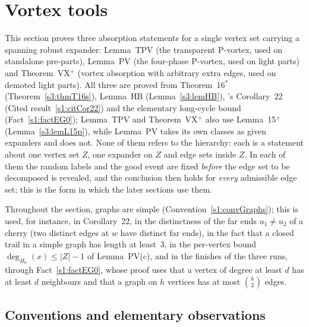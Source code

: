 \section{Vortex tools}\label{s4:sec}

This section proves three absorption statements for a single vertex set carrying a spanning robust expander:
Lemma~TPV (the transparent P-vortex, used on standalone pre-parts), Lemma~PV (the four-phase P-vortex, used on light
parts) and Theorem~VX$^+$ (vortex absorption with arbitrary extra edges, used on demoted light parts). All three are
proved from Theorem~16$^*$ (Theorem~\ref{s3:thmT16s}), Lemma~HB
(Lemma~\ref{s3:lemHB}), \BMnames's Corollary~22 (Cited result~\ref{s1:citCor22}) and the elementary long-cycle
bound (Fact~\ref{s1:factEG0}); Lemma~TPV and Theorem~VX$^+$ also use Lemma~15$^+$ (Lemma~\ref{s3:lemL15p}), while
Lemma~PV takes its own classes as given expanders and does not. None of them refers to the hierarchy: each is a statement about one vertex set $Z$, one
expander on $Z$ and edge sets inside $Z$. In each of them the random labels and the good event are fixed
\emph{before} the edge set to be decomposed is revealed, and the conclusion then holds for \emph{every} admissible edge
set; this is the form in which the later sections use them.

Throughout the section, graphs are simple (Convention~\ref{s1:convGraphs}); this is used, for instance, in
Corollary~22, in the distinctness of the far ends $u_1\ne u_2$ of a cherry (two distinct edges at $w$ have distinct
far ends), in the fact that a closed trail in a simple graph has length at least~$3$, in the per-vertex bound
$\deg_{H_0}(x)\le|Z|-1$ of Lemma~PV(c), and in the finishes of the three runs, through Fact~\ref{s1:factEG0}, whose
proof uses that a vertex of degree at least $d$ has at least $d$ neighbours and that a graph on $h$
vertices has at most $\binom h2$ edges.

\subsection{Conventions and elementary observations}\label{s4:ssecConv}

